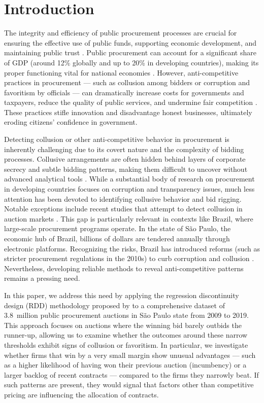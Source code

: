 \section{Introduction}\label{intro}
The integrity and efficiency of public procurement processes are crucial for ensuring the effective use of public funds, supporting economic development, and maintaining public trust \citep{Bosio2022}. Public procurement can account for a significant share of GDP (around 12\% globally and up to 20\% in developing countries), making its proper functioning vital for national economies \citep{Bosio2022}. However, anti-competitive practices in procurement --- such as collusion among bidders or corruption and favoritism by officials --- can dramatically increase costs for governments and taxpayers, reduce the quality of public services, and undermine fair competition \citep{Sokol2017}. These practices stifle innovation and disadvantage honest businesses, ultimately eroding citizens' confidence in government.

Detecting collusion or other anti-competitive behavior in procurement is inherently challenging due to its covert nature and the complexity of bidding processes. Collusive arrangements are often hidden behind layers of corporate secrecy and subtle bidding patterns, making them difficult to uncover without advanced analytical tools \citep{MarshallMarx2012}. While a substantial body of research on procurement in developing countries focuses on corruption and transparency issues, much less attention has been devoted to identifying collusive behavior and bid rigging. Notable exceptions include recent studies that attempt to detect collusion in auction markets \citep[e.g.][]{kawai2022study, baranek2021detection}. This gap is particularly relevant in contexts like Brazil, where large-scale procurement programs operate. In the state of São Paulo, the economic hub of Brazil, billions of dollars are tendered annually through electronic platforms. Recognizing the risks, Brazil has introduced reforms (such as stricter procurement regulations in the 2010s) to curb corruption and collusion \citep{OECD2016}. Nevertheless, developing reliable methods to reveal anti-competitive patterns remains a pressing need.

In this paper, we address this need by applying the regression discontinuity design (RDD) methodology proposed by \cites{kawai2023using} to a comprehensive dataset of 3.8~million public procurement auctions in São Paulo state from 2009 to 2019. This approach focuses on auctions where the winning bid barely outbids the runner-up, allowing us to examine whether the outcomes around these narrow thresholds exhibit signs of collusion or favoritism. In particular, we investigate whether firms that win by a very small margin show unusual advantages --- such as a higher likelihood of having won their previous auction (incumbency) or a larger backlog of recent contracts --- compared to the firms they narrowly beat. If such patterns are present, they would signal that factors other than competitive pricing are influencing the allocation of contracts.

